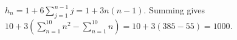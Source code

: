 $h_n=1+6\sum_{j=1}^{n-1}j=1+3n(n-1)$. Summing gives $10+3(\sum_{n=1}^{10}n^2-\sum_{n=1}^{10}n)=10+3(385-55)=\boxed{1000}$.
